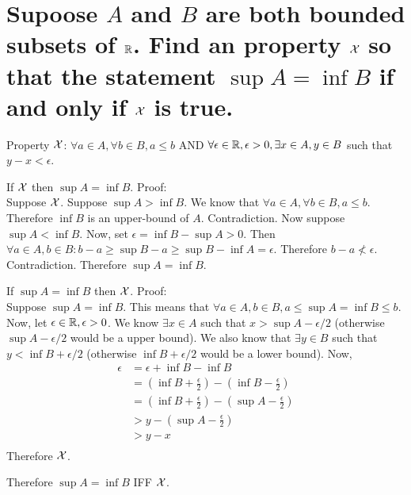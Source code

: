 \section{Supoose $A$ and $B$ are both bounded subsets of $\mathbb{R}$. Find an property $\mathcal{X}$ so that
    the statement $\sup A = \inf B$ if and only if $\mathcal{X}$ is true.}
    
    Property $\mathcal{X}$: $\forall a \in A, \forall b \in B, a \leq b$ 
    AND $\forall \epsilon \in \mathbb{R}, \epsilon >0, \exists x \in A, y \in B$ such that $y - x < \epsilon$.

    If $\mathcal{X}$ then $\sup A = \inf B$. Proof: \\ 
    Suppose $\mathcal{X}$.
    Suppose $\sup A > \inf B$. 
    We know that $\forall a \in A, \forall b \in B, a \leq b$.
    Therefore $\inf B$ is an upper-bound of $A$.
    Contradiction. 
    Now suppose $\sup A < \inf B$.
    Now, set $\epsilon = \inf B - \sup A > 0$.
    Then $\forall a \in A, b\in B: b - a \geq \sup B - a \geq \sup B - \inf A = \epsilon$.
    Therefore $b - a \not < \epsilon$. 
    Contradiction.
    Therefore $\sup A = \inf B$.

    If $\sup A = \inf B$ then $\mathcal{X}$. Proof: \\ 
    Suppose $\sup A = \inf B$.
    This means that $\forall a \in A , b \in B, a \leq \sup A = \inf B \leq b$.
    Now, let $\epsilon \in \mathbb{R}, \epsilon > 0$.
    We know $\exists x \in A$ such that $x > \sup A - \epsilon/2$ (otherwise $\sup A - \epsilon/2$ would be a upper bound).
    We also know that $\exists y \in B$ such that $y < \inf B + \epsilon/2$ (otherwise $\inf B + \epsilon/2$ would be a lower bound).
    Now, 
    \begin{align*}
        \epsilon &= \epsilon + \inf B - \inf B \\ 
        &= (\inf B + \frac{\epsilon}{2}) - (\inf B - \frac{\epsilon}{2}) \\ 
        &= (\inf B + \frac{\epsilon}{2}) - (\sup A - \frac{\epsilon}{2}) \\ 
        &> y - (\sup A - \frac{\epsilon}{2}) \\ 
        &> y - x \\ 
    \end{align*}
    Therefore $\mathcal{X}$.

    Therefore $\sup A = \inf B$ IFF $\mathcal{X}$.